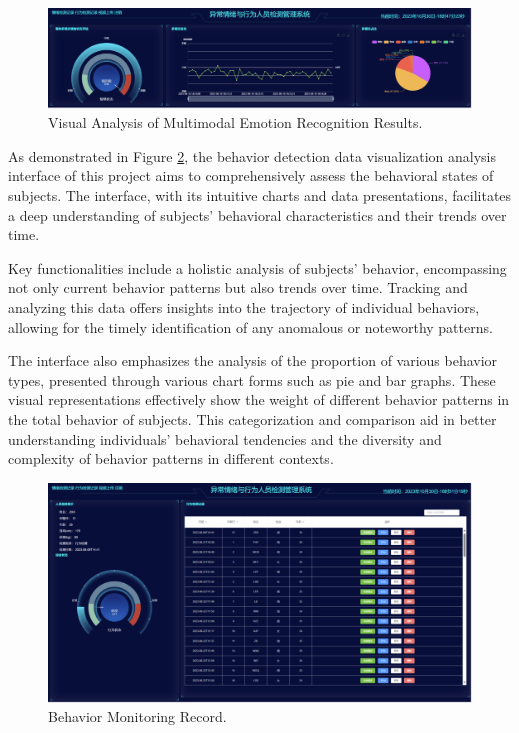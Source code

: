 \documentclass[preprint,12pt]{elsarticle}
\begin{document}
\begin{figure}[h]%
\centering
\includegraphics[width=1\textwidth]{Fig5.png}
\caption{Visual Analysis of Multimodal Emotion Recognition Results.}\label{fig5}
\end{figure}

As demonstrated in Figure \ref{fig6}, the behavior detection data visualization analysis interface of this project aims to comprehensively assess the behavioral states of subjects. The interface, with its intuitive charts and data presentations, facilitates a deep understanding of subjects' behavioral characteristics and their trends over time.

Key functionalities include a holistic analysis of subjects' behavior, encompassing not only current behavior patterns but also trends over time. Tracking and analyzing this data offers insights into the trajectory of individual behaviors, allowing for the timely identification of any anomalous or noteworthy patterns.

The interface also emphasizes the analysis of the proportion of various behavior types, presented through various chart forms such as pie and bar graphs. These visual representations effectively show the weight of different behavior patterns in the total behavior of subjects. This categorization and comparison aid in better understanding individuals' behavioral tendencies and the diversity and complexity of behavior patterns in different contexts.


\begin{figure}[h]%
\centering
\includegraphics[width=1\textwidth]{Fig6.png}
\caption{Behavior Monitoring Record.}\label{fig6}
\end{figure}
\end{document}
